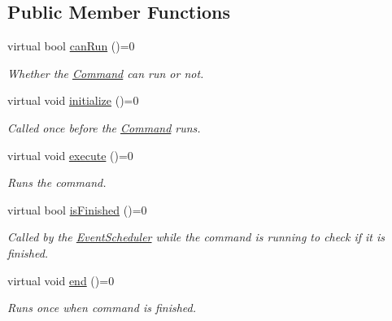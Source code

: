 \subsection*{Public Member Functions}
\begin{DoxyCompactItemize}
\item 
virtual bool \mbox{\hyperlink{classlib_iterative_robot_1_1_command_aebef0fdf029a15ee48fbb778c4265609}{can\+Run}} ()=0
\begin{DoxyCompactList}\small\item\em Whether the \mbox{\hyperlink{classlib_iterative_robot_1_1_command}{Command}} can run or not. \end{DoxyCompactList}\item 
virtual void \mbox{\hyperlink{classlib_iterative_robot_1_1_command_a14543c9d38b07e52f9ffb2af88a63f60}{initialize}} ()=0
\begin{DoxyCompactList}\small\item\em Called once before the \mbox{\hyperlink{classlib_iterative_robot_1_1_command}{Command}} runs. \end{DoxyCompactList}\item 
\mbox{\label{classlib_iterative_robot_1_1_command_a4b38164af1a8645fae2fdae296317cf4}} 
virtual void \mbox{\hyperlink{classlib_iterative_robot_1_1_command_a4b38164af1a8645fae2fdae296317cf4}{execute}} ()=0
\begin{DoxyCompactList}\small\item\em Runs the command. \end{DoxyCompactList}\item 
virtual bool \mbox{\hyperlink{classlib_iterative_robot_1_1_command_a8e4dccdd88f432a716090f532ba097f7}{is\+Finished}} ()=0
\begin{DoxyCompactList}\small\item\em Called by the \mbox{\hyperlink{classlib_iterative_robot_1_1_event_scheduler}{Event\+Scheduler}} while the command is running to check if it is finished. \end{DoxyCompactList}\item 
\mbox{\label{classlib_iterative_robot_1_1_command_ab30847f09859387b70bb7846f7ce7ca4}} 
virtual void \mbox{\hyperlink{classlib_iterative_robot_1_1_command_ab30847f09859387b70bb7846f7ce7ca4}{end}} ()=0
\begin{DoxyCompactList}\small\item\em Runs once when command is finished. \end{DoxyCompactList}\item 

\end{DoxyCompactItemize}
